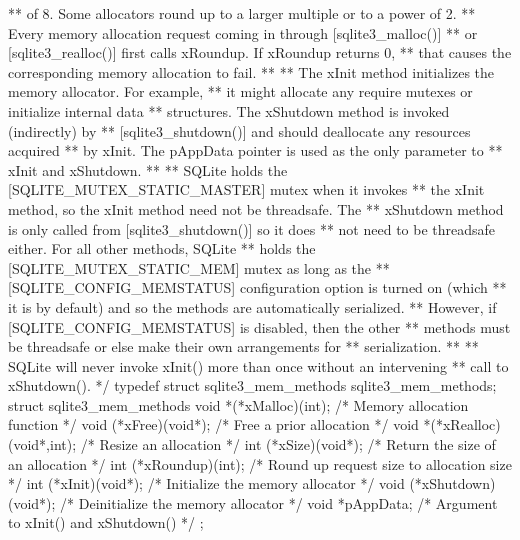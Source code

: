 \begin{Codex}[label=sqlite3.h,numbers=left]
{** of 8.  Some allocators round up to a larger multiple or to a power of 2.
** Every memory allocation request coming in through [sqlite3_malloc()]
** or [sqlite3_realloc()] first calls xRoundup.  If xRoundup returns 0, 
** that causes the corresponding memory allocation to fail.
**
** The xInit method initializes the memory allocator.  For example,
** it might allocate any require mutexes or initialize internal data
** structures.  The xShutdown method is invoked (indirectly) by
** [sqlite3_shutdown()] and should deallocate any resources acquired
** by xInit.  The pAppData pointer is used as the only parameter to
** xInit and xShutdown.
**
** SQLite holds the [SQLITE_MUTEX_STATIC_MASTER] mutex when it invokes
** the xInit method, so the xInit method need not be threadsafe.  The
** xShutdown method is only called from [sqlite3_shutdown()] so it does
** not need to be threadsafe either.  For all other methods, SQLite
** holds the [SQLITE_MUTEX_STATIC_MEM] mutex as long as the
** [SQLITE_CONFIG_MEMSTATUS] configuration option is turned on (which
** it is by default) and so the methods are automatically serialized.
** However, if [SQLITE_CONFIG_MEMSTATUS] is disabled, then the other
** methods must be threadsafe or else make their own arrangements for
** serialization.
**
** SQLite will never invoke xInit() more than once without an intervening
** call to xShutdown().
*/
typedef struct sqlite3_mem_methods sqlite3_mem_methods;
struct sqlite3_mem_methods {
  void *(*xMalloc)(int);         /* Memory allocation function */
  void (*xFree)(void*);          /* Free a prior allocation */
  void *(*xRealloc)(void*,int);  /* Resize an allocation */
  int (*xSize)(void*);           /* Return the size of an allocation */
  int (*xRoundup)(int);          /* Round up request size to allocation size */
  int (*xInit)(void*);           /* Initialize the memory allocator */
  void (*xShutdown)(void*);      /* Deinitialize the memory allocator */
  void *pAppData;                /* Argument to xInit() and xShutdown() */
};

}
\end{Codex}
